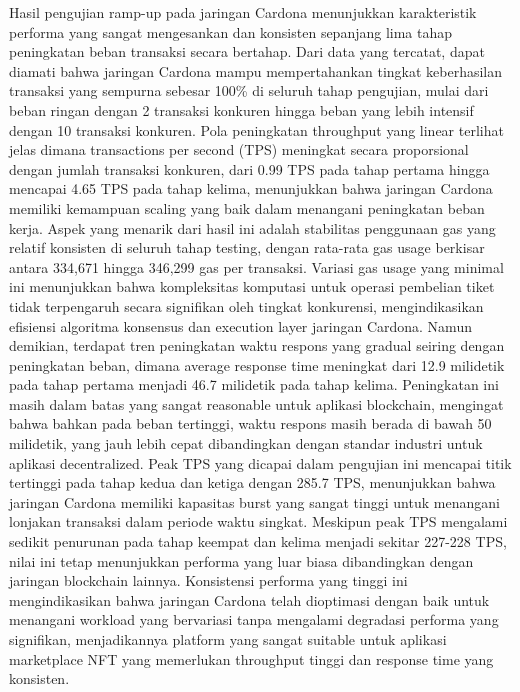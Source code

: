 Hasil pengujian ramp-up pada jaringan Cardona menunjukkan karakteristik
performa yang sangat mengesankan dan konsisten sepanjang lima tahap peningkatan
beban transaksi secara bertahap. Dari data yang tercatat, dapat diamati bahwa
jaringan Cardona mampu mempertahankan tingkat keberhasilan transaksi yang
sempurna sebesar 100\% di seluruh tahap pengujian, mulai dari beban ringan
dengan 2 transaksi konkuren hingga beban yang lebih intensif dengan 10
transaksi konkuren. Pola peningkatan throughput yang linear terlihat jelas
dimana transactions per second (TPS) meningkat secara proporsional dengan
jumlah transaksi konkuren, dari 0.99 TPS pada tahap pertama hingga mencapai
4.65 TPS pada tahap kelima, menunjukkan bahwa jaringan Cardona memiliki
kemampuan scaling yang baik dalam menangani peningkatan beban kerja. Aspek yang
menarik dari hasil ini adalah stabilitas penggunaan gas yang relatif konsisten
di seluruh tahap testing, dengan rata-rata gas usage berkisar antara 334,671
hingga 346,299 gas per transaksi. Variasi gas usage yang minimal ini
menunjukkan bahwa kompleksitas komputasi untuk operasi pembelian tiket tidak
terpengaruh secara signifikan oleh tingkat konkurensi, mengindikasikan
efisiensi algoritma konsensus dan execution layer jaringan Cardona. Namun
demikian, terdapat tren peningkatan waktu respons yang gradual seiring dengan
peningkatan beban, dimana average response time meningkat dari 12.9 milidetik
pada tahap pertama menjadi 46.7 milidetik pada tahap kelima. Peningkatan ini
masih dalam batas yang sangat reasonable untuk aplikasi blockchain, mengingat
bahwa bahkan pada beban tertinggi, waktu respons masih berada di bawah 50
milidetik, yang jauh lebih cepat dibandingkan dengan standar industri untuk
aplikasi decentralized. Peak TPS yang dicapai dalam pengujian ini mencapai
titik tertinggi pada tahap kedua dan ketiga dengan 285.7 TPS, menunjukkan bahwa
jaringan Cardona memiliki kapasitas burst yang sangat tinggi untuk menangani
lonjakan transaksi dalam periode waktu singkat. Meskipun peak TPS mengalami
sedikit penurunan pada tahap keempat dan kelima menjadi sekitar 227-228 TPS,
nilai ini tetap menunjukkan performa yang luar biasa dibandingkan dengan
jaringan blockchain lainnya. Konsistensi performa yang tinggi ini
mengindikasikan bahwa jaringan Cardona telah dioptimasi dengan baik untuk
menangani workload yang bervariasi tanpa mengalami degradasi performa yang
signifikan, menjadikannya platform yang sangat suitable untuk aplikasi
marketplace NFT yang memerlukan throughput tinggi dan response time yang
konsisten.

